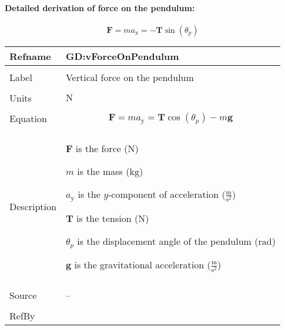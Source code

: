 \documentclass[12pt]{article}
\begin{document}
\paragraph{Detailed derivation of force on the pendulum:}
\label{GD:hForceOnPendulumDeriv}
\begin{displaymath}
\symbf{F}=m {a_{\text{x}}}=-\symbf{T} \sin\left({θ_{p}}\right)
\end{displaymath}
\vspace{\baselineskip}
\noindent
\begin{minipage}{\textwidth}
\begin{tabular}{>{\raggedright}p{}>{\raggedright\arraybackslash}p{}}
\toprule \textbf{Refname} & \textbf{GD:vForceOnPendulum}
\label{GD:vForceOnPendulum}
\\ \midrule \\
Label & Vertical force on the pendulum
        
\\ \midrule \\
Units & ${\text{N}}$
        
\\ \midrule \\
Equation & \begin{displaymath}
           \symbf{F}=m {a_{\text{y}}}=\symbf{T} \cos\left({θ_{p}}\right)-m \symbf{g}
           \end{displaymath}
\\ \midrule \\
Description & \begin{symbDescription}
              \item{$\symbf{F}$ is the force (${\text{N}}$)}
              \item{$m$ is the mass (${\text{kg}}$)}
              \item{${a_{\text{y}}}$ is the $y$-component of acceleration ($\frac{\text{m}}{\text{s}^{2}}$)}
              \item{$\symbf{T}$ is the tension (${\text{N}}$)}
              \item{${θ_{p}}$ is the displacement angle of the pendulum (${\text{rad}}$)}
              \item{$\symbf{g}$ is the gravitational acceleration ($\frac{\text{m}}{\text{s}^{2}}$)}
              \end{symbDescription}
\\ \midrule \\
Source & --
         
\\ \midrule \\
RefBy & 
\\ \bottomrule
\end{tabular}
\end{minipage}
\end{document}
